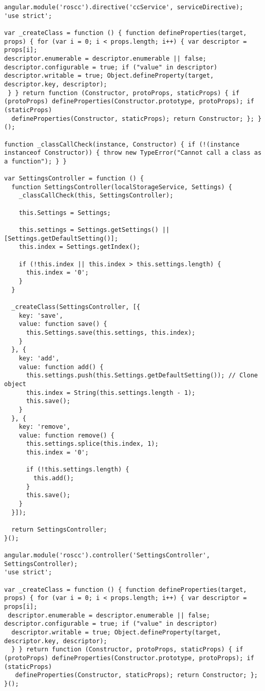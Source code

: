 \begin{verbatim}
angular.module('roscc').directive('ccService', serviceDirective);
'use strict';

var _createClass = function () { function defineProperties(target, props) { for (var i = 0; i < props.length; i++) { var descriptor = props[i]; 
descriptor.enumerable = descriptor.enumerable || false; descriptor.configurable = true; if ("value" in descriptor) 
descriptor.writable = true; Object.defineProperty(target, descriptor.key, descriptor);
 } } return function (Constructor, protoProps, staticProps) { if (protoProps) defineProperties(Constructor.prototype, protoProps); if (staticProps)
  defineProperties(Constructor, staticProps); return Constructor; }; }();

function _classCallCheck(instance, Constructor) { if (!(instance instanceof Constructor)) { throw new TypeError("Cannot call a class as a function"); } }

var SettingsController = function () {
  function SettingsController(localStorageService, Settings) {
    _classCallCheck(this, SettingsController);

    this.Settings = Settings;

    this.settings = Settings.getSettings() || [Settings.getDefaultSetting()];
    this.index = Settings.getIndex();

    if (!this.index || this.index > this.settings.length) {
      this.index = '0';
    }
  }

  _createClass(SettingsController, [{
    key: 'save',
    value: function save() {
      this.Settings.save(this.settings, this.index);
    }
  }, {
    key: 'add',
    value: function add() {
      this.settings.push(this.Settings.getDefaultSetting()); // Clone object
      this.index = String(this.settings.length - 1);
      this.save();
    }
  }, {
    key: 'remove',
    value: function remove() {
      this.settings.splice(this.index, 1);
      this.index = '0';

      if (!this.settings.length) {
        this.add();
      }
      this.save();
    }
  }]);

  return SettingsController;
}();

angular.module('roscc').controller('SettingsController', SettingsController);
'use strict';

var _createClass = function () { function defineProperties(target, props) { for (var i = 0; i < props.length; i++) { var descriptor = props[i];
 descriptor.enumerable = descriptor.enumerable || false; descriptor.configurable = true; if ("value" in descriptor)
  descriptor.writable = true; Object.defineProperty(target, descriptor.key, descriptor);
  } } return function (Constructor, protoProps, staticProps) { if (protoProps) defineProperties(Constructor.prototype, protoProps); if (staticProps)
   defineProperties(Constructor, staticProps); return Constructor; }; }();


\end{verbatim}
